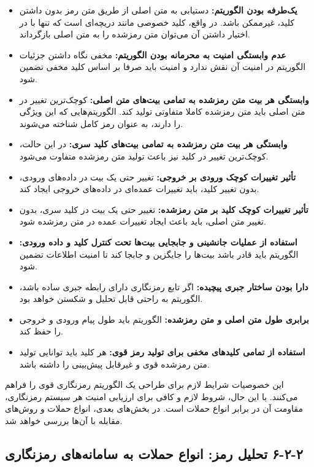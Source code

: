 \begin{itemize}
    \item \textbf{یک‌طرفه بودن الگوریتم:} دستیابی به متن اصلی از طریق متن رمز بدون داشتن کلید، غیرممکن باشد. در واقع، کلید خصوصی مانند دریچه‌ای است که تنها با در اختیار داشتن آن می‌توان متن رمزشده را به متن اصلی بازگرداند.
    \item \textbf{عدم وابستگی امنیت به محرمانه بودن الگوریتم:} مخفی نگاه داشتن جزئیات الگوریتم در امنیت آن نقش ندارد و امنیت باید صرفا بر اساس کلید مخفی تضمین شود.
    \item \textbf{وابستگی هر بیت متن رمزشده به تمامی بیت‌های متن اصلی:} کوچک‌ترین تغییر در متن اصلی باید متن رمزشده کاملا متفاوتی تولید کند. الگوریتم‌هایی که این ویژگی را دارند، به عنوان رمز کامل شناخته می‌شوند.
    \item \textbf{وابستگی هر بیت متن رمزشده به تمامی بیت‌های کلید سری:} در این حالت، کوچک‌ترین تغییر در کلید نیز باعث تولید متن رمزشده متفاوت می‌شود.
    \item \textbf{تأثیر تغییرات کوچک ورودی بر خروجی:} تغییر حتی یک بیت در داده‌های ورودی، بدون تغییر کلید، باید تغییرات عمده‌ای در داده‌های خروجی ایجاد کند.
    \item \textbf{تأثیر تغییرات کوچک کلید بر متن رمزشده:} تغییر حتی یک بیت در کلید سری، بدون تغییر متن اصلی، باید باعث ایجاد تغییرات عمده در متن رمزشده شود.
    \item \textbf{استفاده از عملیات جانشینی و جابجایی بیت‌ها تحت کنترل کلید و داده ورودی:} الگوریتم باید قادر باشد بیت‌ها را جایگزین و جابجا کند تا امنیت اطلاعات تضمین شود.
    \item \textbf{دارا بودن ساختار جبری پیچیده:} اگر تابع رمزنگاری دارای رابطه جبری ساده باشد، الگوریتم به راحتی قابل تحلیل و شکستن خواهد بود.
    \item \textbf{برابری طول متن اصلی و متن رمزشده:} الگوریتم باید طول پیام ورودی و خروجی را حفظ کند.
    \item \textbf{استفاده از تمامی کلیدهای مخفی برای تولید رمز قوی:} هر کلید باید توانایی تولید متن رمزشده قوی و غیرقابل پیش‌بینی را داشته باشد.
\end{itemize}

این خصوصیات شرایط لازم برای طراحی یک الگوریتم رمزنگاری قوی را فراهم می‌کنند. با این حال، شروط لازم و کافی برای ارزیابی امنیت هر سیستم رمزنگاری، مقاومت آن در برابر انواع حملات است. در بخش‌های بعدی، انواع حملات و روش‌های مقابله با آن‌ها بررسی خواهد شد.

\subsection{‏۲‏-‏۲‏-‏۶‏ تحلیل رمز: انواع حملات به سامانه‌های رمزنگاری}

